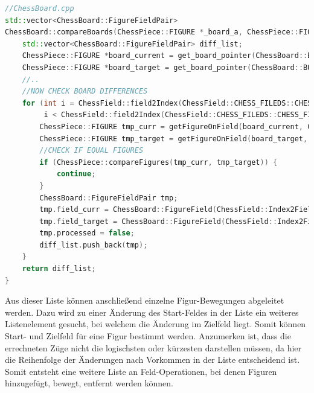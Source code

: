 \begin{lstlisting}[language={C++}]
//ChessBoard.cpp
std::vector<ChessBoard::FigureFieldPair>
ChessBoard::compareBoards(ChessPiece::FIGURE *_board_a, ChessPiece::FIGURE *_board_b, bool _include_park_pos) {
    std::vector<ChessBoard::FigureFieldPair> diff_list;
    ChessPiece::FIGURE *board_current = get_board_pointer(ChessBoard::BOARD_TPYE::REAL_BOARD);
    ChessPiece::FIGURE *board_target = get_board_pointer(ChessBoard::BOARD_TPYE::TARGET_BOARD);
    //..
    //NOW CHECK BOARD DIFFERENCES
    for (int i = ChessField::field2Index(ChessField::CHESS_FILEDS::CHESS_FIELD_A1);
         i < ChessField::field2Index(ChessField::CHESS_FILEDS::CHESS_FIELD_PARK_POSTION_WHITE_1); i++) {
        ChessPiece::FIGURE tmp_curr = getFigureOnField(board_current, ChessField::Index2Field(i));
        ChessPiece::FIGURE tmp_target = getFigureOnField(board_target, ChessField::Index2Field(i));
        //CHECK IF EQUAL FIGURES
        if (ChessPiece::compareFigures(tmp_curr, tmp_target)) {
            continue;
        }
        ChessBoard::FigureFieldPair tmp;
        tmp.field_curr = ChessBoard::FigureField(ChessField::Index2Field(i), tmp_curr);
        tmp.field_target = ChessBoard::FigureField(ChessField::Index2Field(i), tmp_target);
        tmp.processed = false;
        diff_list.push_back(tmp);
    }
    return diff_list;
}
\end{lstlisting}

Aus dieser Liste können anschließend einzelne Figur-Bewegungen
abgeleitet werden. Dazu wird zu einer Änderung des Start-Feldes in der
Liste ein weiteres Listenelement gesucht, bei welchem die Änderung im
Zielfeld liegt. Somit können Start- und Zielfeld für eine Figur bestimmt
werden. Anzumerken ist, dass die errechneten Züge nicht die logischsten
oder kürzesten darstellen müssen, da hier die Reihenfolge der Änderungen
nach Vorkommen in der Liste entscheidend ist. Somit entsteht eine
weitere Liste an Feld-Operationen, bei denen Figuren hinzugefügt,
bewegt, entfernt werden können.

